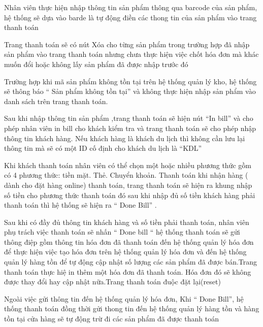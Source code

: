 \documentclass{article}
\begin{document}
Nhân viên thực hiện nhập thông tin sản phẩm thông qua barcode của sản phẩm, hệ thống sẽ dựa vào barde là tự động điền các thong tin của sản phẩm vào trang thanh toán

Trang thanh toán sẽ có nút Xóa cho từng sản phẩm trong trường hợp đã nhập sản phẩm vào trang thanh toán nhưng chưa thực hiện việc chốt hóa đơn mà khác muốn đổi hoặc không lấy sản phẩm đã được nhập trước đó 

Trường hợp khi mã sản phẩm không tồn tại trên hệ thống quản lý kho, hệ thống sẽ thông báo “ Sản phẩm không tồn tại” và không thực hiện nhập sản phẩm vào danh sách trên trang thanh toán.

Sau khi nhập thông tin sản phẩm ,trang thanh toán sẽ hiện nút “In bill” và cho phép nhân viên in bill cho khách kiểm tra và trang thanh toán sẽ cho phép nhập thông tin khách hàng. Nếu khách hàng là khách du lịch thì không cần lưu lại thông tin mà sẽ có một ID cố định cho khách du lịch là “KDL” 

Khi khách thanh toán nhân viên có thể chọn một hoặc nhiều phương thức gồm có 4 phương thức: tiền mặt. Thẻ. Chuyển khoản. Thanh toán khi nhận hàng ( dành cho đặt hàng online)  thanh toán, trang thanh toán sẽ hiện ra khung nhập số tiền cho phương thức thanh toán đó sau khi nhập đủ số tiền khách hàng phải thanh toán thì hệ thống sẽ hiện ra “ Done Bill” . 

Sau khi có đầy đủ thông tin khách hàng và số tiền phải thanh toán,  nhân viên phụ trách việc thanh toán sẽ nhấn “ Done bill “ hệ thống thanh toán sẽ  gửi thông điệp gồm thông tin hóa đơn đã thanh toán đến hệ thống quản lý hóa đơn để thực hiện việc tạo hóa đơn trên hệ thống quản lý hóa đơn và đến hệ thống quản lý hàng tồn để tự động cập nhật số lượng các sản phẩm đã được bán.Trang thanh toán thực hiệ in thêm một hóa đơn đã thanh toán. Hóa đơn đó sẽ không được thay đổi hay cập nhật nữa.Trang thanh toán đuộc đặt lại(reset)

Ngoài việc gửi thông tin đến hệ thống quản lý hóa đơn, Khi “ Done Bill”, hệ thống thanh toán đồng thời gửi thong tin đến hệ thống quản lý hàng tồn và hàng tồn tại cửa hàng sẽ tự động trừ đi các sản phẩm đã được thanh toán
\end{document}

